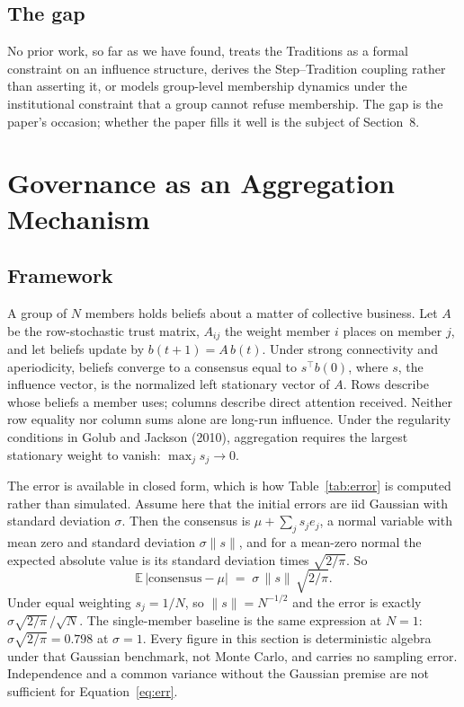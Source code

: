\documentclass[11pt,a4paper]{article}
\begin{document}
\subsection{The gap}

No prior work, so far as we have found, treats the Traditions as a formal
constraint on an influence structure, derives the Step--Tradition coupling rather
than asserting it, or models group-level membership dynamics under the
institutional constraint that a group cannot refuse membership. The gap is the
paper's occasion; whether the paper fills it well is the subject of Section~8.

\section{Governance as an Aggregation Mechanism}

\subsection{Framework}

A group of $N$ members holds beliefs about a matter of collective business. Let
$A$ be the row-stochastic trust matrix, $A_{ij}$ the weight member $i$ places on
member $j$, and let beliefs update by $b(t+1) = A\,b(t)$. Under strong
connectivity and aperiodicity, beliefs converge to a consensus equal to
$s^{\top}b(0)$, where $s$, the influence vector, is the normalized left stationary
vector of $A$. Rows describe whose beliefs a member uses; columns describe direct
attention received. Neither row equality nor column sums alone are long-run
influence. Under the regularity conditions in Golub and Jackson (2010), aggregation
requires the largest stationary weight to vanish: $\max_j s_j \to 0$.

The error is available in closed form, which is how Table~\ref{tab:error} is
computed rather than simulated. Assume here that the initial errors are iid
Gaussian with standard deviation $\sigma$. Then the consensus is
$\mu + \sum_j s_j e_j$, a normal
variable with mean zero and standard deviation $\sigma\lVert s\rVert$, and for a
mean-zero normal the expected absolute value is its standard deviation times
$\sqrt{2/\pi}$. So
\begin{equation}
\mathbb{E}\,\lvert \text{consensus} - \mu \rvert \;=\; \sigma\,\lVert s\rVert\,\sqrt{2/\pi}.
\label{eq:err}
\end{equation}
Under equal weighting $s_j = 1/N$, so $\lVert s\rVert = N^{-1/2}$ and the error is
exactly $\sigma\sqrt{2/\pi}\,/\sqrt{N}$. The single-member baseline is the same
expression at $N=1$: $\sigma\sqrt{2/\pi} = 0.798$ at $\sigma = 1$. Every figure in
this section is deterministic algebra under that Gaussian benchmark, not Monte
Carlo, and carries no sampling error. Independence and a common variance without
the Gaussian premise are not sufficient for Equation~\ref{eq:err}.
\end{document}
